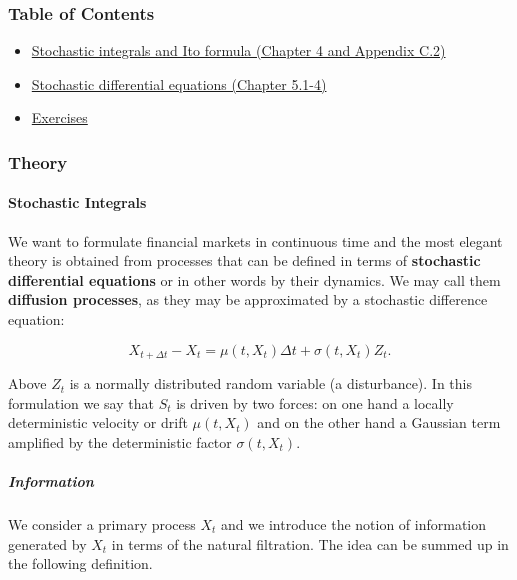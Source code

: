 \documentclass[
]{article}
\begin{document}
\hypertarget{table-of-contents-1}{%
\subsubsection{Table of Contents}\label{table-of-contents-1}}

\begin{itemize}
\item
  \protect\hyperlink{stochastic-integrals}{Stochastic integrals and Ito
  formula (Chapter 4 and Appendix C.2)}
\item
  \protect\hyperlink{stochastic-differential-equations}{Stochastic
  differential equations (Chapter 5.1-4)}
\item
  \protect\hyperlink{exercises-week-2}{Exercises}
\end{itemize}

\hypertarget{theory-1}{%
\subsubsection{Theory}\label{theory-1}}

\hypertarget{stochastic-integrals}{%
\paragraph{Stochastic Integrals}\label{stochastic-integrals}}

We want to formulate financial markets in continuous time and the most
elegant theory is obtained from processes that can be defined in terms
of \textbf{stochastic differential equations} or in other words by their
dynamics. We may call them \textbf{diffusion processes}, as they may be
approximated by a stochastic difference equation:

\[
X_{t+\Delta t}-X_t=\mu(t,X_t)\Delta t+\sigma(t,X_t)Z_t.\tag{4.1}
\]

Above \(Z_t\) is a normally distributed random variable (a disturbance).
In this formulation we say that \(S_t\) is driven by two forces: on one
hand a locally deterministic velocity or drift \(\mu(t,X_t)\) and on the
other hand a Gaussian term amplified by the deterministic factor
\(\sigma(t,X_t)\).

\hypertarget{information}{%
\subparagraph{Information}\label{information}}

We consider a primary process \(X_t\) and we introduce the notion of
information generated by \(X_t\) in terms of the natural filtration. The
idea can be summed up in the following definition.
\end{document}
